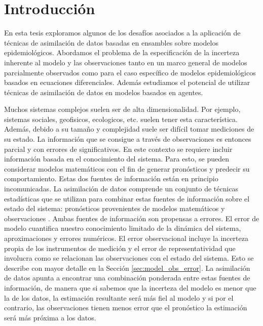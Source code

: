 \chapter{Introducción}
En esta tesis exploramos algunos de los desafíos asociados a la aplicación de técnicas de asimilación de datos basadas en ensambles sobre modelos epidemiológicos. Abordamos el problema de la especificación de la incerteza inherente al modelo y las observaciones tanto en un marco general de modelos parcialmente observados como para el caso específico de modelos epidemiológicos basados en ecuaciones diferenciales. Además estudiamos el potencial de utilizar técnicas de asimilación de datos en modelos basados en agentes.

Muchos sistemas complejos suelen ser de alta dimensionalidad. Por ejemplo, sistemas sociales, geofisicos, ecologicos, etc. suelen tener esta característica. Además, debido a su tamaño y complejidad suele ser difícil tomar mediciones de su estado. La información que se consigue a través de observaciones es entonces parcial y con errores de significativos. En este contexto se requiere incluir información basada en el conocimiento del sistema. Para esto, se pueden considerar modelos matemáticos con el fin de generar pronósticos y predecir su comportamiento. Estas dos fuentes de información están en principio incomunicadas. La asimilación de datos comprende un conjunto de técnicas estadísticas que se utilizan para combinar estas fuentes de información sobre el estado del sistema: pronósticos provenientes de modelos matemáticos y observaciones \citep{Kalnay2003}. Ambas fuentes de información son propensas a errores. El error de modelo cuantifica nuestro conocimiento limitado de la dinámica del sistema, aproximaciones y errores numéricos. El error observacional incluye la incerteza propia de los instrumentos de medición y el error de representatividad que involucra como se relacionan las observaciones con el estado del sistema. Esto se describe con mayor detalle en la Sección \ref{sec:model_obs_error}. La asimilación de datos apunta a encontrar una combinación ponderada entre estas fuentes de información, de manera que si sabemos que la incerteza del modelo es menor que la de los datos, la estimación resultante será más fiel al modelo y si por el contrario, las observaciones tienen menos error que el pronóstico la estimación será más próxima a los datos.

